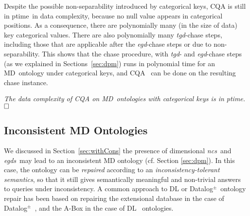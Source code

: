 \documentclass[format=acmsmall, review=false, screen=true]{acmart}
\newcommand{\ignore}[1]{}
\newcommand{\boxtheorem}{\ensuremath{\hfill \Box}}
\newcommand{\dpm}{{Datalog}$^\pm$}
\newcommand{\qa}{QA}
\newcommand{\md}{MD}
\newcommand{\ptime}{{\sc ptime}}
\newcommand{\egds}{{\em egds}}
\newcommand{\egd}{{\em egd}}
\newcommand{\tgd}{{\em tgd}}
\newcommand{\ncs}{{\em ncs}}
\newcommand{\blue}[1]{{#1}}
\newcommand{\comlb}[1]{{\vspace{2mm}\noindent \bf \blue{COMM(LEO):}}~ #1 \hfill {\bf
    END.}\\}
\newcommand{\commos}[1]{{\vspace{2mm}\noindent \bf \blue{COMM(MOSTAFA):}}~ #1 \hfill {\bf
    END.}\\}
\begin{document}
Despite the possible non-separability introduced by categorical keys, CQA is still in \ptime \ in data complexity, because no null value appears in categorical positions. As a consequence, there are polynomially many (in the size of data) key categorical  values. There are also polynomially many \tgd-chase steps, including those that are applicable after the \egd-chase steps or due to non-separability. This shows that the chase procedure, with \tgd- and \egd-chase steps (as we explained in Sections~\ref{sec:dpm}) runs in polynomial time for an \md \ ontology under categorical keys, and CQA \ can be done on the resulting chase instance.

\ignore{
 \comlb{NEW: Better give a bit more details for what follows. What kind of chase? Why does it stop? In failure or not? What's the size of the chase? So, the algorithm is basically querying the chase when there is no failure?}
 \comlb{So, how would be the algorithm in this case? Can we say more? In particular, anything that can be reused rom our RR paper (not with Cali)? }
 \commos{Here, we lose separability, but it does not matter because there at finitely many keys (made of categorical values) and the chase always stops. \qa \ is simple as we have terminating chase. Basically, separability only matters when there is infinite chase and we would like to guarantee the egds do not interact with this infinite chase and destroy the good computational properties of the infinite chase.}  }

\begin{proposition}\em \label{prop:key} The data complexity of CQA on \md \ ontologies with categorical keys is in \ptime.\boxtheorem\end{proposition}


\subsection{Inconsistent MD Ontologies}\label{sec:inco}

 We discussed in Section~\ref{sec:withCons}  the presence of dimensional \ncs \ and \egds \ may lead to an inconsistent MD ontology (cf. Section \ref{sec:dpm}). In this case, the ontology can be {\em repaired}  according to an {\em inconsistency-tolerant semantics}, so that it still gives semantically meaningful and non-trivial answers to queries under inconsistency. A common approach to DL or \dpm \ ontology repair has been based on repairing the extensional database in the case of \dpm \ \cite{lukasiewicz12}, and the A-Box in the case of DL~\cite{lembo10,rosati,bienvenu14,lembo15,bienvenu16} ontologies.
\end{document}
